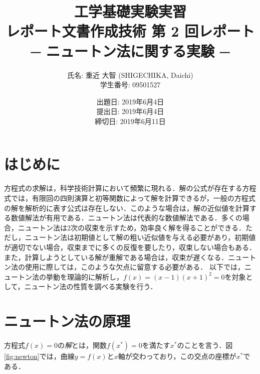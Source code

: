 \documentclass[a4j,11pt]{jarticle}
\title{工学基礎実験実習 \\
       レポート文書作成技術 第 2 回レポート\\─ ニュートン法に関する実験 ─}
\author{氏名: 重近 大智 (SHIGECHIKA, Daichi) \\
        学生番号: 09501527}
\date{出題日: 2019年6月4日 \\
      提出日: 2019年6月4日 \\
      締切日: 2019年6月11日 \\}
\begin{document}
\maketitle
\tableofcontents
\section{はじめに}
方程式の求解は，科学技術計算において頻繁に現れる．解の公式が存在する方程式では，有限回の四則演算と初等関数によって解を計算できるが，一般の方程式の解を解析的に表す公式は存在しない．このような場合は，解の近似値を計算する数値解法が有用である．ニュートン法\cite{author1,author3}は代表的な数値解法である．多くの場合，ニュートン法は2次の収束を示すため，効率良く解を得ることができる．ただし，ニュートン法は初期値として解の粗い近似値を与える必要があり，初期値が適切でない場合，収束までに多くの反復を要したり，収束しない場合もある．また，計算しようとしている解が重解である場合は，収束が遅くなる．ニュートン法の使用に際しては，このような欠点に留意する必要がある．
以下では，ニュートン法の挙動を理論的に解析し，$f(x)=(x-1)(x+1)^2=0$を対象として，ニュートン法の性質を調べる実験を行う．
\section{ニュートン法の原理}
方程式$f(x)=0$の{\em 解}とは，関数$f(x^*)=0$を満たす$x^*$のことを言う．図\ref{fig:newton}では，曲線$y=f(x)$と$x$軸が交わっており，この交点の座標が$x^*$である．
\end{document}

